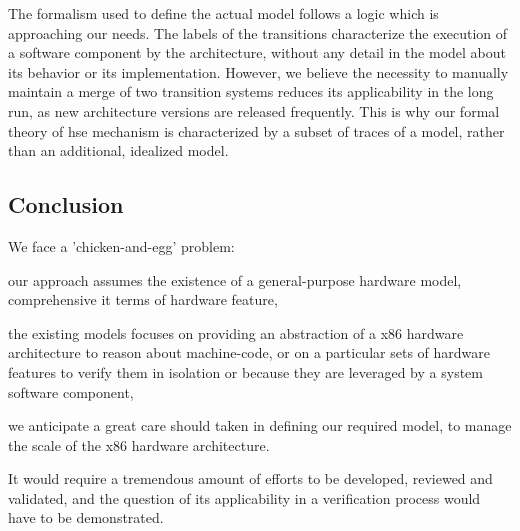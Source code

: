 %
The formalism used to define the actual model follows a logic which is
approaching our needs.
%
The labels of the transitions characterize the execution of a software component
by the architecture, without any detail in the model about its behavior or its
implementation.
%
However, we believe the necessity to manually maintain a merge of two transition
systems reduces its applicability in the long run, as new architecture versions
are released frequently.
%
This is why our formal theory of \ac{hse} mechanism is characterized by a subset
of traces of a model, rather than an additional, idealized model.
%

\subsection{Conclusion}
\label{subsec:sota:ltsconclusion}

We face a 'chicken-and-egg' problem:
%
\begin{inparaenum}[(1)]
\item our approach assumes the existence of a general-purpose hardware model,
  comprehensive it terms of hardware feature,
\item the existing models focuses on providing an abstraction of a x86 hardware
  architecture to reason about machine-code, or on a particular sets of hardware
  features to verify them in isolation or because they are leveraged by a system
  software component,
\item we anticipate a great care should taken in defining our required model, to
  manage the scale of the x86 hardware architecture.
\end{inparaenum}
%
It would require a tremendous amount of efforts to be developed, reviewed and
validated, and the question of its applicability in a verification process would
have to be demonstrated.

